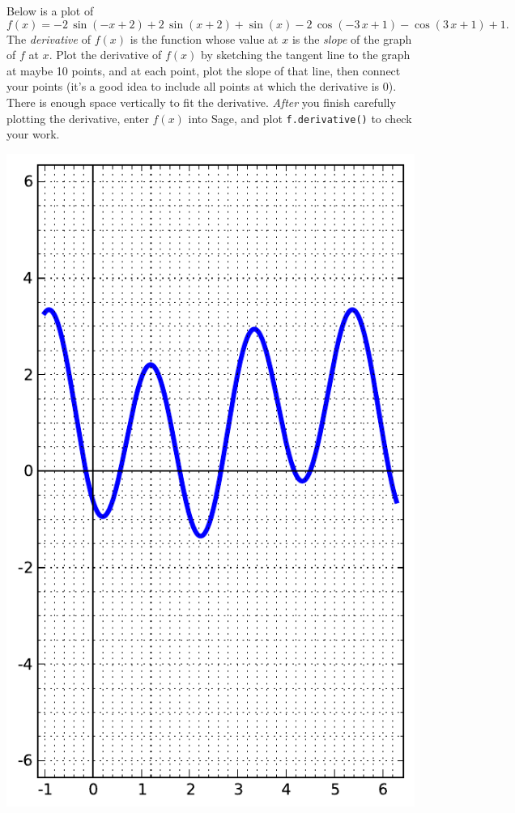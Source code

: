 Below is a plot of $$f(x)=-2 \, \sin\left(-x + 2\right) + 2 \, \sin\left(x + 2\right) + \sin\left(x\right) - 2 \, \cos\left(-3 \, x + 1\right) - \cos\left(3 \, x + 1\right) + 1.$$  The {\em \color{red}derivative} of $f(x)$ is the function whose value at $x$ is the {\em slope} of the graph of $f$ at $x$.  Plot the derivative of $f(x)$ by sketching the tangent line to the graph at maybe 10 points, and at each point, plot the slope of that line, then connect your points (it's a good idea to include all points at which the derivative is 0).  There is enough space vertically to fit the derivative.  {\em After} you finish carefully plotting the derivative, enter $f(x)$ into Sage, and plot {\color{blue}\verb|f.derivative()|} to check your work.
\begin{center}\includegraphics{functions/31.pdf}\end{center}\newpage

